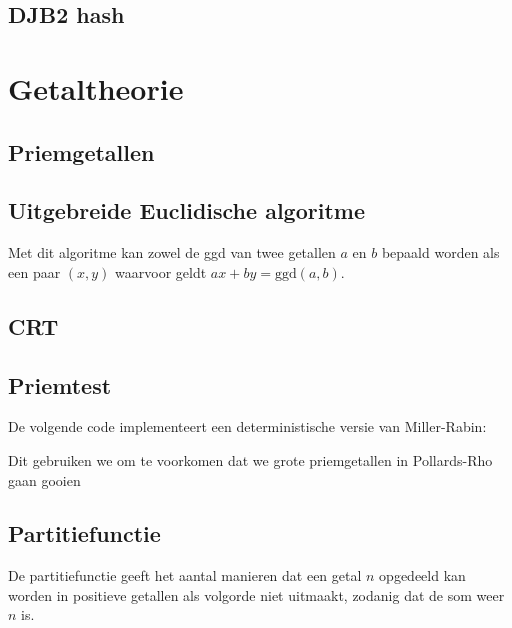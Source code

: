 \documentclass[10pt,a4paper,titlepage]{article}
\begin{document}
\subsection{DJB2 hash}


\section{Getaltheorie}
\subsection{Priemgetallen}



\subsection{Uitgebreide Euclidische algoritme}
Met dit algoritme kan zowel de ggd van twee getallen $a$ en $b$ bepaald worden als een paar $(x,y)$ waarvoor geldt $ax + by = \textrm{ggd}(a,b)$.

\begin{minipage}{0.5\textwidth}

\end{minipage}
\begin{minipage}{0.5\textwidth}

\end{minipage}

\subsection{CRT}


\subsection{Priemtest}

De volgende code implementeert een deterministische versie van Miller-Rabin:



Dit gebruiken we om te voorkomen dat we grote priemgetallen in Pollards-Rho gaan gooien


\subsection{Partitiefunctie}

De partitiefunctie geeft het aantal manieren dat een getal $n$ opgedeeld kan worden in positieve getallen als volgorde niet uitmaakt, zodanig dat de som weer $n$ is.
\end{document}
